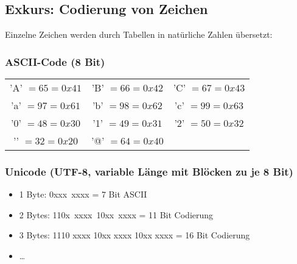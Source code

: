 \documentclass[a4paper,12pt]{article}
\theoremstyle{definition}
\begin{document}
	\setcounter{section}{5}
	\setcounter{subsection}{5}
	\subsection{Exkurs: Codierung von Zeichen}
	Einzelne Zeichen werden durch Tabellen in natürliche Zahlen übersetzt:
	\subsubsection*{ASCII-Code (8 Bit)}
	\begin{tabular}{ccc}
		'A' $ = 65 = 0x41$ & 'B' $ = 66 = 0x42$ & 'C' $ = 67 = 0x43$\\
		'a' $ = 97 = 0x61$ & 'b' $ = 98 = 0x62$ & 'c' $ = 99 = 0x63$\\
		'0' $ = 48 = 0x30$ & '1' $ = 49 = 0x31$ & '2' $ = 50 = 0x32$\\
		'\textvisiblespace' $ = 32 = 0x20$ & '@' $ = 64 = 0x40$
	\end{tabular}
	\subsubsection*{Unicode (UTF-8, variable Länge mit Blöcken zu je 8 Bit)}
	\begin{itemize}
		\item 1 Byte: 0xxx~xxxx = 7 Bit ASCII
		\item 2 Bytes: 110x~xxxx~10xx~xxxx = 11 Bit Codierung
		\item 3 Bytes: 1110 xxxx 10xx xxxx 10xx xxxx = 16 Bit Codierung
		\item \ldots
	\end{itemize}
	
\end{document}
